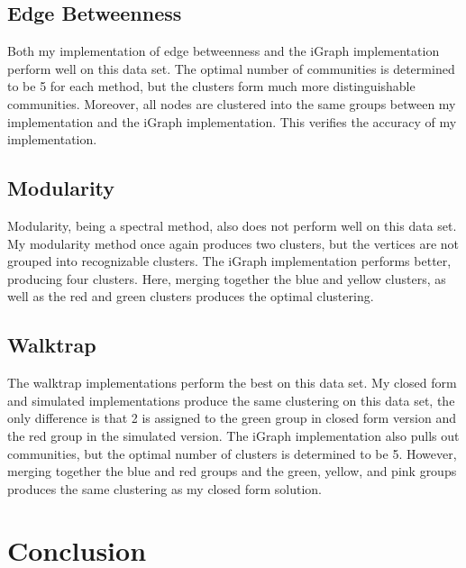 \documentclass{article}
\begin{document}
    \subsection{Edge Betweenness}
    Both my implementation of edge betweenness and the iGraph implementation perform well on this data set. The optimal number of communities is determined to be 5 for each method, but the clusters form much more distinguishable communities. Moreover, all nodes are clustered into the same groups between my implementation and the iGraph implementation. This verifies the accuracy of my implementation.

    \subsection{Modularity}
    Modularity, being a spectral method, also does not perform well on this data set. My modularity method once again produces two clusters, but the vertices are not grouped into recognizable clusters. The iGraph implementation performs better, producing four clusters. Here, merging together the blue and yellow clusters, as well as the red and green clusters produces the optimal clustering.

    \subsection{Walktrap}
    The walktrap implementations perform the best on this data set. My closed form and simulated implementations produce the same clustering on this data set, the only difference is that 2 is assigned to the green group in closed form version and the red group in the simulated version. The iGraph implementation also pulls out communities, but the optimal number of clusters is determined to be 5. However, merging together the blue and red groups and the green, yellow, and pink groups produces the same clustering as my closed form solution.
    \par


\section{Conclusion}


\newpage



\newpage
\end{document}
